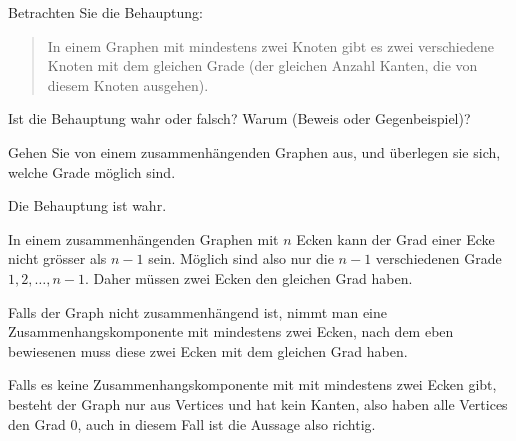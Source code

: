 Betrachten Sie die Behauptung:
\begin{quote}
In einem Graphen mit mindestens zwei Knoten gibt es zwei verschiedene Knoten
mit dem gleichen Grade (der gleichen Anzahl Kanten, die von diesem
Knoten ausgehen).
\end{quote}
Ist die Behauptung wahr oder falsch? Warum (Beweis
oder Gegenbeispiel)?

\begin{hinweis}
Gehen Sie von einem zusammenhängenden Graphen
aus, und überlegen sie sich, welche Grade möglich sind.
\end{hinweis}

\begin{loesung}
Die Behauptung ist wahr.

In einem zusammenhängenden Graphen mit $n$
Ecken kann der Grad einer Ecke nicht grösser als $n-1$ sein.
Möglich sind also nur die $n-1$ verschiedenen Grade
$1,2,\dots,n-1$. Daher müssen zwei Ecken den gleichen Grad
haben.

Falls der Graph nicht zusammenhängend ist, nimmt man eine
Zusammenhangskomponente mit mindestens zwei Ecken, nach dem
eben bewiesenen muss diese zwei Ecken mit dem gleichen
Grad haben.

Falls es keine Zusammenhangskomponente mit mit mindestens
zwei Ecken gibt, besteht der Graph nur aus Vertices und hat
kein Kanten, also haben alle Vertices den Grad $0$, auch
in diesem Fall ist die Aussage also richtig.
\end{loesung}
